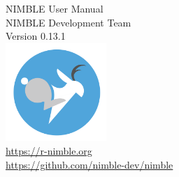 \thispagestyle{empty}
\begin{center}
{\huge NIMBLE User Manual}\\ 
\vspace{0.2in}
{\large NIMBLE Development Team}\\
\vspace{0.2in}
{\large Version 0.13.1}\\
\vspace{3in}
\includegraphics[width=1.5in]{../nimble-icon.png}\\
{\large
\href{https://r-nimble.org}{https://r-nimble.org}\\
\href{https://github.com/nimble-dev/nimble}{https://github.com/nimble-dev/nimble}
}
\end{center}

